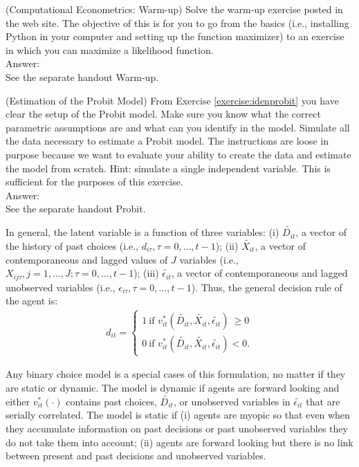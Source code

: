 \begin{exercise} (Computational Econometrics: Warm-up)
Solve the warm-up exercise posted in the web site. The objective of this is for you to go from the basics (i.e., installing Python in your computer and setting up the function maximizer) to an exercise in which you can maximize a likelihood function.\\
\noindent Answer:\\
\noindent See the separate handout Warm-up. 
\end{exercise}

\begin{exercise} (Estimation of the Probit Model)
From Exercise \ref{exercise:idenprobit} you have clear the setup of the Probit model. Make sure you know what the correct parametric assumptions are and what can you identify in the model. Simulate all the data necessary to estimate a Probit model. The instructions are loose in purpose because we want to evaluate your ability to create the data and estimate the model from scratch. Hint: simulate a single independent variable. This is sufficient for the purposes of this exercise.\\
\noindent Answer:\\
\noindent See the separate handout Probit. 
\end{exercise}

\indent In general, the latent variable is a function of three variables: (i) $\tilde{D_{it}}$, a vector of the history of past choices (i.e., $d_{i\tau}, \tau = 0, \ldots, t-1$); (ii) $\tilde{X_{it}}$, a vector of contemporaneous and lagged values of $J$ variables (i.e., $X_{ij\tau},  j = 1, \ldots, J; \tau = 0, \ldots, t-1$); (iii) $\tilde{\epsilon_{it}}$, a vector of contemporaneous and lagged  unobserved variables (i.e., $\epsilon_{i\tau}, \tau = 0, \ldots, t-1$). Thus, the general decision rule of the agent is:
\begin{eqnarray}
d_{it} =
\begin{cases}
1 \  \text{if }  v_{it}^* \left( \tilde{D_{it}}, \tilde{X_{it}}, \tilde{\epsilon_{it}} \right) \ \geq 0  \\
0 \  \text{if }  v_{it}^* \left( \tilde{D_{it}}, \tilde{X_{it}}, \tilde{\epsilon_{it}} \right)  < 0. \label{eq:latent}
\end{cases}
\end{eqnarray}

\indent Any binary choice model is a special cases of this formulation, no matter if they are static or dynamic. The model is dynamic if agents are forward looking and either $v_{it}^* (\cdot)$ contains past choices, $\tilde{D_{it}}$, or unobserved variables in $\tilde{\epsilon_{it}}$ that are serially correlated. The model is static if (i) agents are myopic so that even when they accumulate information on past decisions or past unobserved variables they do not take them into account; (ii) agents are forward looking but there is no link between present and past decisions and unobserved variables.

